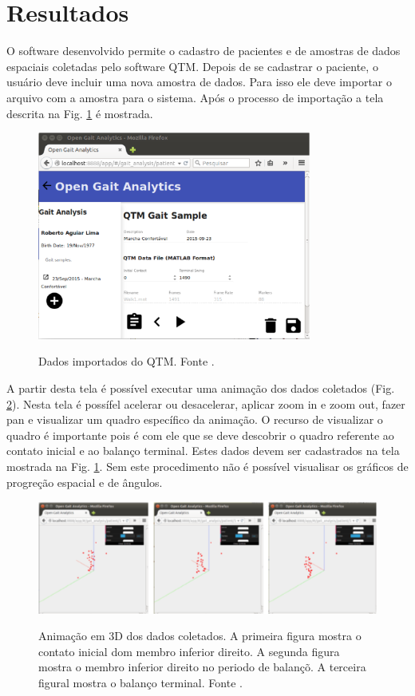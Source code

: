 \documentclass[journal]{IEEEtran}
\begin{document}
\section{Resultados}
O software desenvolvido permite o cadastro de pacientes e de amostras de dados espaciais
coletadas pelo software QTM. 
Depois de se cadastrar o paciente, o usuário deve incluir uma nova amostra de dados.
Para isso ele deve importar o arquivo com a amostra para o sistema. Após o processo de 
importação a tela descrita na Fig. \ref{qtm_data} é mostrada.


\begin{figure}[!t]
	\centering
	{\includegraphics[width=9cm]{tela7}}
	\caption{Dados importados do QTM. Fonte \cite{Lima2015}.}
	\label{qtm_data}
\end{figure}


A partir desta tela é possível executar uma animação dos dados coletados (Fig. \ref{animacao}).
Nesta tela é possífel acelerar ou desacelerar, aplicar zoom in e zoom out, fazer pan e visualizar
um quadro específico da animação. O recurso de visualizar o quadro é importante pois é com ele
que se deve descobrir o quadro referente ao contato inicial e ao balanço terminal. Estes
dados devem ser cadastrados na tela mostrada na Fig. \ref{qtm_data}. Sem este procedimento não
é possível visualisar os gráficos de progreção espacial e de ângulos.

\begin{figure}[tb]
	\centering
	{\includegraphics[width=\textwidth]{animacao}}
	\caption{Animação em 3D dos dados coletados. A primeira figura mostra o contato inicial
	dom membro inferior direito. A segunda figura mostra o membro inferior direito no
	periodo de balançõ. A terceira figural mostra o balanço terminal. Fonte \cite{Lima2015}.}
	\label{animacao}
\end{figure}
\end{document}

